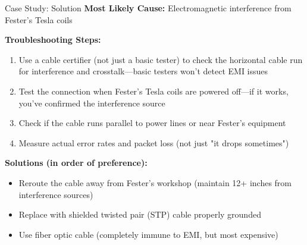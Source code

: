 \documentclass[aspectratio=169]{beamer}
\begin{document}
\begin{frame}{Case Study: Solution}
    \textbf{Most Likely Cause:} Electromagnetic interference from Fester's Tesla coils
    
    \vspace{0.3cm}
    \textbf{Troubleshooting Steps:}
    \begin{enumerate}
        \item Use a cable certifier (not just a basic tester) to check the horizontal cable run for interference and crosstalk---basic testers won't detect EMI issues
        \item Test the connection when Fester's Tesla coils are powered off---if it works, you've confirmed the interference source
        \item Check if the cable runs parallel to power lines or near Fester's equipment
        \item Measure actual error rates and packet loss (not just "it drops sometimes")
    \end{enumerate}
    
    \vspace{0.3cm}
    \textbf{Solutions (in order of preference):}
    \begin{itemize}
        \item Reroute the cable away from Fester's workshop (maintain 12+ inches from interference sources)
        \item Replace with shielded twisted pair (STP) cable properly grounded
        \item Use fiber optic cable (completely immune to EMI, but most expensive)
    \end{itemize}
\end{frame}
\end{document}
